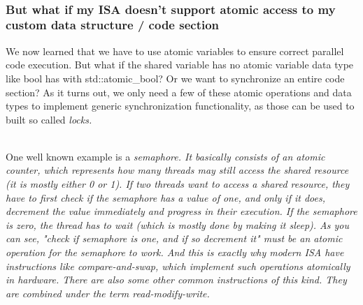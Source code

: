 \documentclass[../../main.tex]{subfiles}
\begin{document}
~\\
\subsubsection{But what if my ISA doesn't support atomic access to my custom data structure / code section}
We now learned that we have to use atomic variables to ensure correct parallel code execution.
But what if the shared variable has no atomic variable data type like bool has with std::atomic\_bool?
Or we want to synchronize an entire code section?
As it turns out, we only need a few of these atomic operations and data types to implement generic synchronization functionality, as those can be used to built so called \em locks\em . 

~\\
One well known example is a \em semaphore\em . It basically consists of an atomic counter, which represents how many threads may still access the shared resource (it is mostly either 0 or 1).
If two threads want to access a shared resource, they have to first check if the semaphore has a value of one, and only if it does, decrement the value immediately and progress in their execution.
If the semaphore is zero, the thread has to wait (which is mostly done by making it sleep).
As you can see, "check if semaphore is one, and if so decrement it" must be an atomic operation for the semaphore to work.
And this is exactly why modern ISA have instructions like \em compare-and-swap\em , which implement such operations atomically in hardware.
There are also some other common instructions of this kind. They are combined under the term \em read-modify-write\em .
\end{document}
